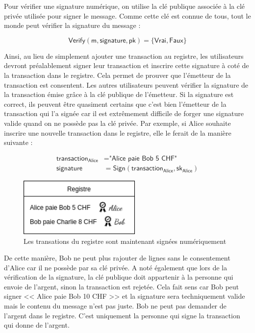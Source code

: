 Pour vérifier une signature numérique, on utilise la clé publique associée à la clé privée utilisée pour signer le message. Comme cette clé est connue de tous, tout le monde peut vérifier la signature du message :

\begin{equation*}
  \mathsf{Verify(m, signature, pk)} = \{\mathsf{Vrai}, \mathsf{Faux}\}
\end{equation*}

Ainsi, au lieu de simplement ajouter une transaction au registre, les utilisateurs devront préalablement signer leur transaction et inscrire cette signature à coté de la transaction dans le registre. Cela permet de prouver que l'émetteur de la transaction est consentent. Les autres utilisateurs peuvent vérifier la signature de la transaction émise grâce à la clé publique de l'émetteur. Si la signature est correct, ils peuvent être quasiment certains que c'est bien l'émetteur de la transaction qui l'a signée car il est extrêmement difficile de forger une signature valide quand on ne possède pas la clé privée. Par exemple, si Alice souhaite inscrire une nouvelle transaction dans le registre, elle le ferait de la manière suivante :

\begin{align*}
  \mathsf{transaction_{Alice}} &= \textsf{"Alice paie Bob 5 CHF"}\\
  \mathsf{signature} &= \mathsf{Sign(transaction_{Alice}, sk_{Alice})}
\end{align*}

\begin{figure}[H]
  \centering
  \includegraphics[width=6cm]{images/crypto_3.png}
  \caption{Les transations du registre sont maintenant signées numériquement}
\end{figure}

De cette manière, Bob ne peut plus rajouter de lignes sans le consentement d'Alice car il ne possède par sa clé privée. A noté également que lors de la vérification de la signature, la clé publique doit appartenir à la personne qui envoie de l'argent, sinon la transaction est rejetée. Cela fait sens car Bob peut signer << Alice paie Bob 10 CHF >> et la signature sera techniquement valide mais le contenu du message n'est pas juste. Bob ne peut pas demander de l'argent dans le registre. C'est uniquement la personne qui signe la transaction qui donne de l'argent. 

